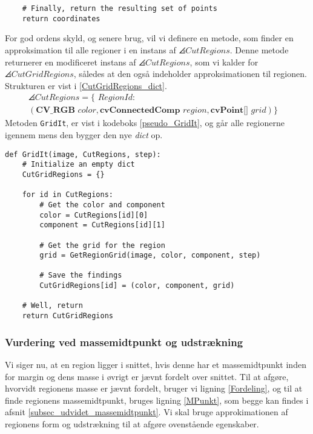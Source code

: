 {\begin{lstlisting}
    # Finally, return the resulting set of points
    return coordinates
\end{lstlisting}
\newpage
For god ordens skyld, og senere brug, vil vi definere en metode, som finder
en approksimation til alle regioner i en instans af $\angles{CutRegions}$. Denne
metode returnerer en modificeret instans af $\angles{CutRegions}$, som
vi kalder for $\angles{CutGridRegions}$, således at den også indeholder
approksimationen til regionen. Strukturen er vist i
\eqref{CutGridRegions_dict}.
\begin{multline}
    \angles{CutRegions} = \{ \textit{~RegionId} : \\
    (\textbf{CV\_RGB~}\textit{color}, \textbf{cvConnectedComp~}\textit{region}, \textbf{cvPoint[]~}\textit{grid}) \}\quad
    \label{CutGridRegions_dict}
\end{multline}
Metoden \texttt{GridIt}, er vist i kodeboks \ref{pseudo_GridIt}, og går
alle regionerne igennem mens den bygger den nye \emph{dict} op.

\begin{lstlisting}[caption={Metode, som finder approksimationen til alle
    regioner i en instans af $\angles{CutRegions}$.}, captionpos=b,
    label={pseudo_GridIt}, frame=tb,
    breaklines=false, float=t]
def GridIt(image, CutRegions, step):
    # Initialize an empty dict
    CutGridRegions = {}

    for id in CutRegions:
        # Get the color and component
        color = CutRegions[id][0]
        component = CutRegions[id][1]

        # Get the grid for the region
        grid = GetRegionGrid(image, color, component, step)

        # Save the findings
        CutGridRegions[id] = (color, component, grid)

    # Well, return
    return CutGridRegions
\end{lstlisting}

\subsubsection{Vurdering ved massemidtpunkt og udstrækning}
Vi siger nu, at en region ligger i snittet, hvis denne har et
massemidtpunkt inden for margin og dens masse i øvrigt er jævnt fordelt
over snittet. Til at afgøre, hvorvidt regionens masse er jævnt fordelt,
bruger vi ligning \eqref{Fordeling}, og til at finde regionens
massemidtpunkt, bruges ligning \eqref{MPunkt}, som begge kan findes i
afsnit \ref{subsec_udvidet_massemidtpunkt}. Vi skal bruge
approkimationen af regionens form og udstrækning til at afgøre
ovenstående egenskaber.

}
